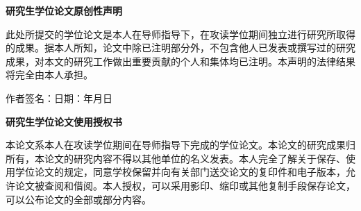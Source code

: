 
\pagestyle{empty}

\setlength{\parindent}{2\ccwd}
\setlength{\parskip}{0pt}
\renewcommand{\baselinestretch}{1.4}

\begin{center}
  {\xihei\bfseries{}\schoolName\zufeDegreeName 研究生学位论文原创性声明}
\end{center}

\vspace{8mm}


{\songti
此处所提交的\zufeDegreeName 学位论文是本人在导师指导下，在\schoolName 攻读\zufeDegreeName 学位期间独立进行研究所取得的成果。据本人所知，论文中除已注明部分外，不包含他人已发表或撰写过的研究成果，对本文的研究工作做出重要贡献的个人和集体均已注明。本声明的法律结果将完全由本人承担。\par}

\vspace{12mm}

\begin{center}
  {\songti 作者签名：\hspace{50mm}日期：\hspace{6mm}年\hspace{6mm}月\hspace{6mm}日}
\end{center}

\vspace{28mm}

\begin{center}
  {\xihei\bfseries{}\schoolName\zufeDegreeName 研究生学位论文使用授权书}
\end{center}

\vspace{8mm}

{\songti
本论文系本人在\schoolName 攻读\zufeDegreeName 学位期间在导师指导下完成的\zufeDegreeName 学位论文。本论文的研究成果归\schoolName 所有，本论文的研究内容不得以其他单位的名义发表。本人完全了解\schoolName 关于保存、使用学位论文的规定，同意学校保留并向有关部门送交论文的复印件和电子版本，允许论文被查阅和借阅。本人授权\schoolName ，可以采用影印、缩印或其他复制手段保存论文，可以公布论文的全部或部分内容。\par}

\vspace{12mm}

